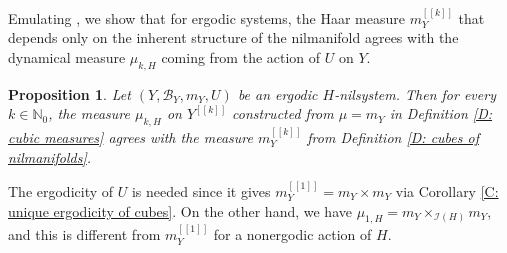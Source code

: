 \documentclass[11pt]{amsart}
\newtheorem{proposition}[lemma]{Proposition}
\theoremstyle{definition}
\newcommand{\N}{{\mathbb N}}
\newcommand{\CB}{{\mathcal B}}
\newcommand{\CI}{{\mathcal I}}
\newcommand{\cube}[1]{{[\![#1]\!]}}
\newcommand{\1}{{\mathbf{1}}}
\begin{document}
Emulating \cite[Chapter 12, Proposition~7]{HK18}, we show that for ergodic systems, the Haar measure $m^\cube{k}_Y$ that depends only on the inherent structure of the nilmanifold agrees with the dynamical measure $\mu_{k,H}$ coming from the action of $U$ on $Y$.
\begin{proposition}\label{P: identification of measures}
    Let $(Y, \CB_Y, m_Y, U)$ be an ergodic $H$-nilsystem. Then for every $k\in\N_0$, the measure $\mu_{k,H}$ on $Y^{\cube{k}}$ constructed from $\mu = m_Y$ in Definition \ref{D: cubic measures} agrees with the measure $m_Y^\cube{k}$ from Definition \ref{D: cubes of nilmanifolds}.
\end{proposition}
The ergodicity of $U$ is needed since it gives $m_Y^\cube{1} = m_Y\times m_Y$ via Corollary \ref{C: unique ergodicity of cubes}. On the other hand, we have $\mu_{1,H} = m_Y \times_{\CI(H)}m_Y$, and this is different from $m_Y^\cube{1}$ for a nonergodic action of $H$.
\end{document}
